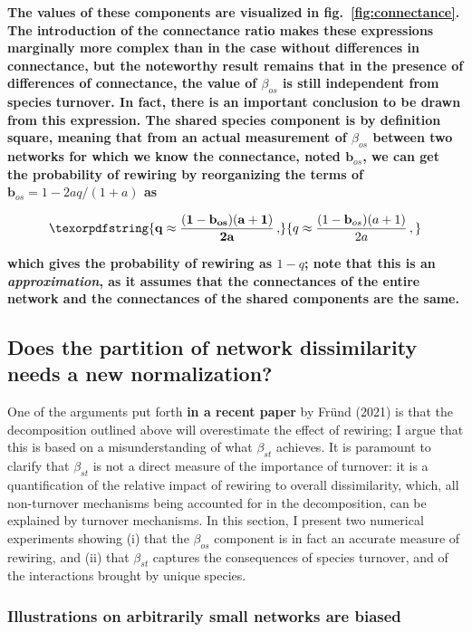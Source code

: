 \documentclass[11pt]{article}
\makeatletter
\def\maxwidth{\ifdim\Gin@nat@width>\linewidth\linewidth
\else\Gin@nat@width\fi}
\let\Oldincludegraphics\includegraphics
\renewcommand{\includegraphics}[1]{\Oldincludegraphics[width=\maxwidth]{#1}}
\providecommand{\DIFaddtex}[1]{{\bf #1}} %
\providecommand{\DIFaddbegin}{\protect\color{blue}} %
\providecommand{\DIFaddend}{\protect\color{black}} %
\providecommand{\DIFadd}[1]{\texorpdfstring{\DIFaddtex{#1}}{#1}} %
\newcommand{\DIFaddincludegraphics}[2][]{{\color{blue}\fbox{\DIFOincludegraphics[#1]{#2}}}} %
\DeclareRobustCommand{\DIFaddbegin}{\DIFOaddbegin \let\includegraphics\DIFaddincludegraphics} %
\DeclareRobustCommand{\DIFaddend}{\DIFOaddend \let\includegraphics\DIFOincludegraphics} %
\makeatother
\begin{document}
\DIFadd{The values of these components are visualized in
fig.~\ref{fig:connectance}. The introduction of the connectance ratio
makes these expressions marginally more complex than in the case without
differences in connectance, but the noteworthy result remains that in
the presence of differences of connectance, the value of \(\beta_{os}\)
is still independent from species turnover. In fact, there is an
important conclusion to be drawn from this expression. The shared
species component is by definition square, meaning that from an actual
measurement of \(\beta_{os}\) between two networks for which we know the
connectance, noted \(\mathbf{b}_{os}\), we can get the probability of
rewiring by reorganizing the terms of
\(\mathbf{b}_{os} = 1 - 2aq/(1+a)\) as
}

\[\DIFadd{q \approx \frac{(1-\mathbf{b}_{os})(a+1)}{2a}\,,}\]

\DIFadd{which gives the probability of rewiring as \(1-q\); note that this is an
\emph{approximation}, as it assumes that the connectances of the entire
network and the connectances of the shared components are the same.
}

\hypertarget{does-the-partition-of-network-dissimilarity-needs-a-new-normalization}{%
\subsection{Does the partition of network dissimilarity needs a new
normalization?}\label{does-the-partition-of-network-dissimilarity-needs-a-new-normalization}}
\DIFaddend 

One of the arguments put forth \DIFaddbegin \DIFadd{in a recent paper }\DIFaddend by Fründ (2021) is that
the decomposition outlined above will overestimate the effect of
rewiring; I argue that this is based on a misunderstanding of what
\(\beta_{st}\) achieves. It is paramount to clarify that \(\beta_{st}\)
is not a direct measure of the importance of turnover: it is a
quantification of the relative impact of rewiring to overall
dissimilarity, which, all non-turnover mechanisms being accounted for in
the decomposition, can be explained by turnover mechanisms. In this
section, I present two numerical experiments showing (i) that the
\(\beta_{os}\) component is in fact an accurate measure of rewiring, and
(ii) that \(\beta_{st}\) captures the consequences of species turnover,
and of the interactions brought by unique species.

\hypertarget{illustrations-on-arbitrarily-small-networks-are-biased}{%
\subsubsection{Illustrations on arbitrarily small networks are
biased}\label{illustrations-on-arbitrarily-small-networks-are-biased}}
\end{document}
